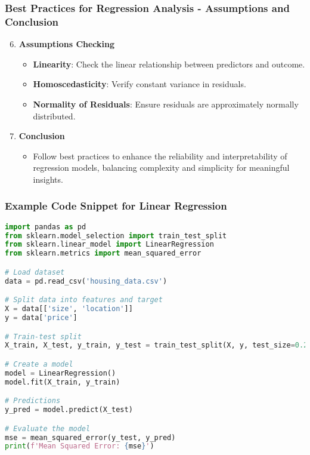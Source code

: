 \documentclass[aspectratio=169]{beamer}
\begin{document}
\begin{frame}[fragile]
    \frametitle{Best Practices for Regression Analysis - Assumptions and Conclusion}
    \begin{enumerate}
        \setcounter{enumi}{5}
        \item \textbf{Assumptions Checking}
        \begin{itemize}
            \item \textbf{Linearity}: Check the linear relationship between predictors and outcome.
            \item \textbf{Homoscedasticity}: Verify constant variance in residuals.
            \item \textbf{Normality of Residuals}: Ensure residuals are approximately normally distributed.
        \end{itemize}
        
        \item \textbf{Conclusion}
        \begin{itemize}
            \item Follow best practices to enhance the reliability and interpretability of regression models, balancing complexity and simplicity for meaningful insights.
        \end{itemize}
    \end{enumerate}
\end{frame}

\begin{frame}[fragile]
    \frametitle{Example Code Snippet for Linear Regression}
    \begin{lstlisting}[language=Python]
import pandas as pd
from sklearn.model_selection import train_test_split
from sklearn.linear_model import LinearRegression
from sklearn.metrics import mean_squared_error

# Load dataset
data = pd.read_csv('housing_data.csv')

# Split data into features and target
X = data[['size', 'location']]
y = data['price']

# Train-test split
X_train, X_test, y_train, y_test = train_test_split(X, y, test_size=0.2, random_state=42)

# Create a model
model = LinearRegression()
model.fit(X_train, y_train)

# Predictions
y_pred = model.predict(X_test)

# Evaluate the model
mse = mean_squared_error(y_test, y_pred)
print(f'Mean Squared Error: {mse}')
    \end{lstlisting}
\end{frame}
\end{document}
